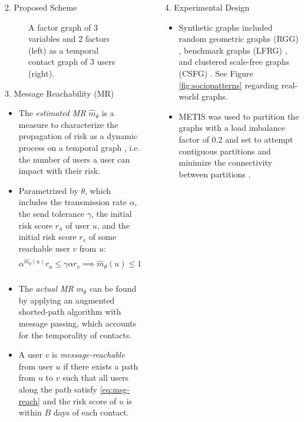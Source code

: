 \documentclass[final]{beamer}
\newlength{\sepwidth}
\newlength{\colwidth}
\newcommand{\separatorcolumn}{\begin{column}{\sepwidth}\end{column}}
\newcommand{\sval}{r}
\newcommand{\reach}{m_{\theta}}
\newcommand{\estreach}{\hat{m}_{\theta}}
\begin{document}
\begin{frame}[t]
\begin{columns}[t]
\begin{column}{\colwidth}
\begin{block}{2. Proposed Scheme}
\begin{figure}
{
			}%
			\caption{A factor graph of 3 variables and 2 factors (left) as a temporal contact graph of 3 users (right).}
			\label{fig:temporal-graph}
		\end{figure}
	\end{block}
	\begin{block}{3. Message Reachability (MR)}
		\begin{itemize}
			\item The \emph{estimated MR} $\estreach$ is a measure to characterize the propagation of risk as a dynamic process on a temporal graph \cite{Barrat2013}, i.e. the number of users a user can impact with their risk.
			\item Parametrized by $\theta$, which includes the transmission rate $\alpha$, the send tolerance $\gamma$, the initial risk score $r_u$ of user $u$, and the initial risk score $r_v$ of some reachable user $v$ from $u$:
				\begin{equation} \label{eq:msg-reach}
					 \alpha^{\estreach(u)} \sval_u \leq \gamma \alpha \sval_v \implies \estreach(u)
					 	\leq 1 + \log_{\alpha}\left(\frac{\gamma \sval_v}{\sval_u}\right)
				\end{equation}
			\item The \emph{actual MR} $\reach$ can be found by applying an augmented shorted-path algorithm with message passing, which accounts for the temporality of contacts.
			\item A user $v$ is \emph{message-reachable} from user $u$ if there exists a path from $u$ to $v$ such that all users along the path satisfy \eqref{eq:msg-reach} and the risk score of $u$ is within $B$ days of each contact.
		\end{itemize}
	\end{block}
\end{column}
\separatorcolumn
\begin{column}{\colwidth}
	\begin{block}{4. Experimental Design}
		\begin{itemize}
			\item Synthetic graphs included random geometric graphs (RGG) \cite{Dall2002}, benchmark graphs (LFRG) \cite{Lancichinetti2008}, and clustered scale-free graphs (CSFG) \cite{Holme2002}. See Figure \ref{fig:sociopatterns} regarding real-world graphs.
			\item METIS was used to partition the graphs with a load imbalance factor of 0.2 and set to attempt contiguous partitions and minimize the connectivity between partitions \cite{Karypis1998}.

\end{itemize}
\end{block}
\end{column}
\end{columns}
\end{frame}
\end{document}
